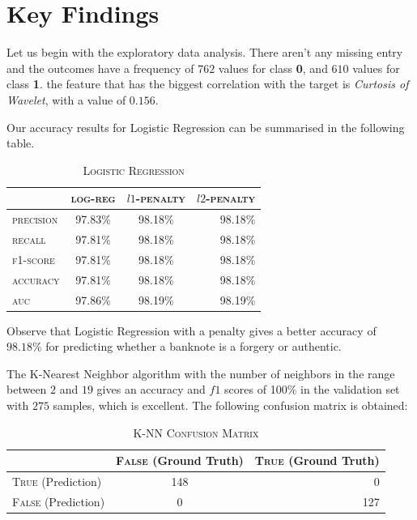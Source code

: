 \documentclass[a4paper,11pt]{amsart}
\begin{document}
\section{Key Findings}\label{results}

Let us begin with the exploratory data analysis. There aren't any missing entry and the outcomes have a frequency of $762$ values for class \textbf{0}, and $610$ values for class \textbf{1}. the feature that has the biggest correlation with the target is \emph{Curtosis of Wavelet}, with a value of $0.156$. 

Our accuracy results for Logistic Regression can be summarised in the following table.
\begin{table}[h!]
  \begin{center}
    \caption{\textsc{Logistic Regression}}
    \label{tab:table1}
    \begin{tabular}{l|c|c|r|} 
      & \textsc{log-reg} & \textsc{$l1$-penalty} & \textsc{$l2$-penalty}\\
      \hline
      \textsc{precision} & 97.83\%  & 98.18\% & 98.18\%\\
      \textsc{recall} & 97.81\% & 98.18\% & 98.18\%\\
      \textsc{f1-score} & 97.81\%  & 98.18\% & 98.18\%\\
      \textsc{accuracy} & 97.81\% & 98.18\% & 98.18\%\\
      \textsc{auc} & 97.86\% & 98.19\% & 98.19\%\\
    \end{tabular}
  \end{center}
\end{table}
Observe that Logistic Regression with a penalty gives a better accuracy of $98.18\%$ for predicting whether a banknote is a forgery or authentic. 

\medbreak

The K-Nearest Neighbor algorithm with the number of neighbors in the range between $2$ and $19$ gives an accuracy and $f1$ scores of 100\% in the validation set with $275$ samples, which is excellent. The following confusion matrix is obtained:
\begin{table}[h!]
  \begin{center}
    \caption{\textsc{K-NN Confusion Matrix}}
    \label{tab:table2}
    \begin{tabular}{l|c|r|} 
      & \textsc{False} (Ground Truth) & \textsc{True} (Ground Truth)\\
      \hline
      \textsc{True} (Prediction) & 148 & 0\\
      \textsc{False} (Prediction) & 0 & 127\\
    \end{tabular}
  \end{center}
\end{table}
\end{document}
